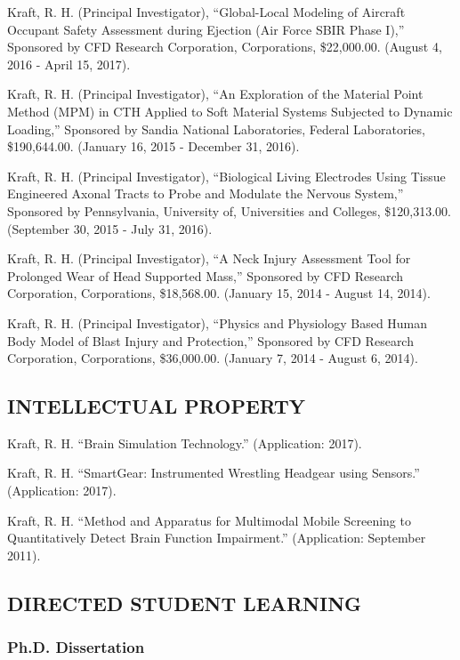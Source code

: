 \documentclass[11pt]{article}
\begin{document}
Kraft, R. 
H. 
(Principal Investigator), ``Global-Local Modeling of
Aircraft Occupant Safety Assessment during Ejection (Air Force SBIR
Phase I),'' Sponsored by CFD Research Corporation, Corporations,
\$22,000.00. 
(August 4, 2016 - April 15, 2017).

Kraft, R. 
H. 
(Principal Investigator), ``An Exploration of the Material
Point Method (MPM) in CTH Applied to Soft Material Systems Subjected to
Dynamic Loading,'' Sponsored by Sandia National Laboratories, Federal
Laboratories, \$190,644.00. 
(January 16, 2015 - December 31, 2016).

Kraft, R. 
H. 
(Principal Investigator), ``Biological Living Electrodes
Using Tissue Engineered Axonal Tracts to Probe and Modulate the Nervous
System,'' Sponsored by Pennsylvania, University of, Universities and
Colleges, \$120,313.00. 
(September 30, 2015 - July 31, 2016).

Kraft, R. 
H. 
(Principal Investigator), ``A Neck Injury Assessment Tool
for Prolonged Wear of Head Supported Mass,'' Sponsored by CFD Research
Corporation, Corporations, \$18,568.00. 
(January 15, 2014 - August 14,
2014).

Kraft, R. 
H. 
(Principal Investigator), ``Physics and Physiology Based
Human Body Model of Blast Injury and Protection,'' Sponsored by CFD
Research Corporation, Corporations, \$36,000.00. 
(January 7, 2014 -
August 6, 2014).

\subsection{INTELLECTUAL PROPERTY}\label{intellectual-property}

Kraft, R. 
H. 
``Brain Simulation Technology.'' (Application: 2017).

Kraft, R. 
H. 
``SmartGear: Instrumented Wrestling Headgear using Sensors.''
(Application: 2017).

Kraft, R. 
H. 
``Method and Apparatus for Multimodal Mobile Screening to
Quantitatively Detect Brain Function Impairment.'' (Application:
September 2011).

\subsection{DIRECTED STUDENT LEARNING}
\subsubsection{Ph.D. 
Dissertation}
\end{document}
